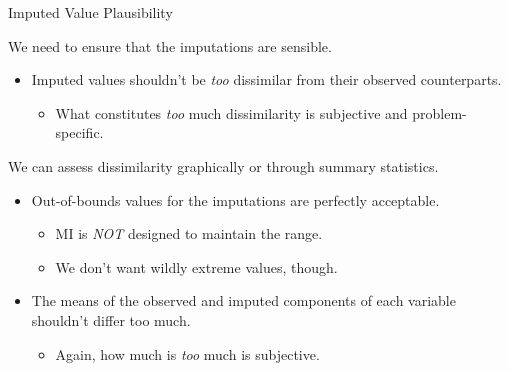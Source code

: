 \documentclass{beamer}\usepackage[]{graphicx}\usepackage[]{color}
\begin{document}
\begin{frame}{Imputed Value Plausibility}
  
  We need to ensure that the imputations are sensible.
  \vc
  \begin{itemize}
  \item Imputed values shouldn't be \emph{too} dissimilar from their observed 
    counterparts.
    \begin{itemize}
    \item What constitutes \emph{too} much dissimilarity is subjective and 
      problem-specific.
    \end{itemize}
  \end{itemize}
  \vb
  We can assess dissimilarity graphically or through summary statistics.
  \vc
  \begin{itemize}
  \item Out-of-bounds values for the imputations are perfectly acceptable.
    \begin{itemize}
    \item MI is \emph{NOT} designed to maintain the range.
    \item We don't want wildly extreme values, though.
    \end{itemize}
    \vc
  \item The means of the observed and imputed components of each variable 
    shouldn't differ too much.
    \begin{itemize}
    \item Again, how much is \emph{too} much is subjective.
    \end{itemize}
  \end{itemize}
  
\end{frame}

\watermarkoff %
\end{document}

